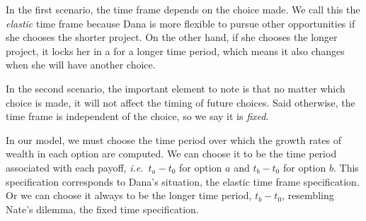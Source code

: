 \documentclass[11pt]{article}
\newcommand{\ie}{{\it i.e.}\ }
\newcommand{\Dt}{\Delta t}
\numberwithin{equation}{section}
\begin{document}
In the first scenario, the time frame depends on the choice made. We call this the \textit{elastic} time frame because Dana is more flexible to pursue other opportunities if she chooses the shorter project. On the other hand, if she chooses the longer project, it locks her in a for a longer time period, which means it also changes when she will have another choice.  

In the second scenario, the important element to note is that no matter which choice is made, it will not affect the timing of future choices. Said otherwise, the time frame is independent of the choice, so we say it is \textit{fixed}.

In our model, we must choose the time period over which the growth rates of wealth in each option are computed. We can choose it to be the time period associated with each payoff, \ie $t_a-t_0$ for option $a$ and $t_b-t_0$ for option $b$. This specification corresponds to Dana's situation, the elastic time frame specification. Or we can choose it always to be the longer time period, $t_b-t_0$, resembling Nate's dilemma, the fixed time specification.




\end{document}
